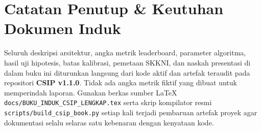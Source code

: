 \documentclass[11pt,a4paper,oneside]{book}
\newcommand{\code}[1]{{\small\nolinkurl{#1}}}
\begin{document}
\backmatter
\chapter*{Catatan Penutup \& Keutuhan Dokumen Induk}
Seluruh deskripsi arsitektur, angka metrik leaderboard, parameter algoritma, hasil uji hipotesis, batas kalibrasi, pemetaan SKKNI, dan naskah presentasi di dalam buku ini diturunkan langsung dari kode aktif dan artefak teraudit pada repositori \textbf{CSIP v1.1.0}. Tidak ada angka metrik fiktif yang dibuat untuk memperindah laporan. Gunakan berkas sumber LaTeX \code{docs/BUKU_INDUK_CSIP_LENGKAP.tex} serta skrip kompilator resmi \code{scripts/build_csip_book.py} setiap kali terjadi pembaruan artefak proyek agar dokumentasi selalu selaras satu kebenaran dengan kenyataan kode.
\end{document}
